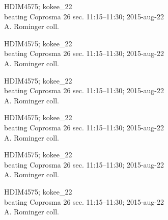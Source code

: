 \documentclass[2pt]{extarticle}
\begin{document}
\noindent
\parbox{0.16\textwidth}{\tiny \raggedright \rule[-0.3\baselineskip]{0pt}{10pt}HDIM4575; kokee\_22\\ beating Coprosma 26 sec. 11:15--11:30; 2015-aug-22\\ A. Rominger coll.}
\parbox{0.16\textwidth}{\tiny \raggedright \rule[-0.3\baselineskip]{0pt}{10pt}HDIM4575; kokee\_22\\ beating Coprosma 26 sec. 11:15--11:30; 2015-aug-22\\ A. Rominger coll.}
\parbox{0.16\textwidth}{\tiny \raggedright \rule[-0.3\baselineskip]{0pt}{10pt}HDIM4575; kokee\_22\\ beating Coprosma 26 sec. 11:15--11:30; 2015-aug-22\\ A. Rominger coll.}
\parbox{0.16\textwidth}{\tiny \raggedright \rule[-0.3\baselineskip]{0pt}{10pt}HDIM4575; kokee\_22\\ beating Coprosma 26 sec. 11:15--11:30; 2015-aug-22\\ A. Rominger coll.}
\parbox{0.16\textwidth}{\tiny \raggedright \rule[-0.3\baselineskip]{0pt}{10pt}HDIM4575; kokee\_22\\ beating Coprosma 26 sec. 11:15--11:30; 2015-aug-22\\ A. Rominger coll.}
\parbox{0.16\textwidth}{\tiny \raggedright \rule[-0.3\baselineskip]{0pt}{10pt}HDIM4575; kokee\_22\\ beating Coprosma 26 sec. 11:15--11:30; 2015-aug-22\\ A. Rominger coll.} \\ 
\vspace{0.001in} 
\end{document}
